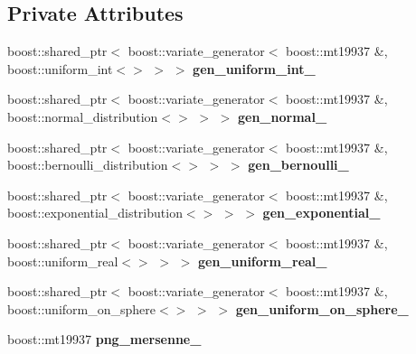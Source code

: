 \subsection*{Private Attributes}
\begin{CompactItemize}
\item 
\hypertarget{class_distribution_generator_7631897310c1faaf465efe831e6d38b0}{
boost::shared\_\-ptr$<$ boost::variate\_\-generator$<$ boost::mt19937 \&, boost::uniform\_\-int$<$$>$ $>$ $>$ \textbf{gen\_\-uniform\_\-int\_\-}}
\label{class_distribution_generator_7631897310c1faaf465efe831e6d38b0}

\item 
\hypertarget{class_distribution_generator_d3ba3b04de2853ff8e7a30dfcef6d081}{
boost::shared\_\-ptr$<$ boost::variate\_\-generator$<$ boost::mt19937 \&, boost::normal\_\-distribution$<$$>$ $>$ $>$ \textbf{gen\_\-normal\_\-}}
\label{class_distribution_generator_d3ba3b04de2853ff8e7a30dfcef6d081}

\item 
\hypertarget{class_distribution_generator_ee0c415f08c1fae8dee3ca10c23f9b96}{
boost::shared\_\-ptr$<$ boost::variate\_\-generator$<$ boost::mt19937 \&, boost::bernoulli\_\-distribution$<$$>$ $>$ $>$ \textbf{gen\_\-bernoulli\_\-}}
\label{class_distribution_generator_ee0c415f08c1fae8dee3ca10c23f9b96}

\item 
\hypertarget{class_distribution_generator_d4807485cfe60d54b47a14e2115987c9}{
boost::shared\_\-ptr$<$ boost::variate\_\-generator$<$ boost::mt19937 \&, boost::exponential\_\-distribution$<$$>$ $>$ $>$ \textbf{gen\_\-exponential\_\-}}
\label{class_distribution_generator_d4807485cfe60d54b47a14e2115987c9}

\item 
\hypertarget{class_distribution_generator_0910c15a4e74475eff33ff5b82a2ac8d}{
boost::shared\_\-ptr$<$ boost::variate\_\-generator$<$ boost::mt19937 \&, boost::uniform\_\-real$<$$>$ $>$ $>$ \textbf{gen\_\-uniform\_\-real\_\-}}
\label{class_distribution_generator_0910c15a4e74475eff33ff5b82a2ac8d}

\item 
\hypertarget{class_distribution_generator_e0b00c288f47cc07973ac3c3d4a23975}{
boost::shared\_\-ptr$<$ boost::variate\_\-generator$<$ boost::mt19937 \&, boost::uniform\_\-on\_\-sphere$<$$>$ $>$ $>$ \textbf{gen\_\-uniform\_\-on\_\-sphere\_\-}}
\label{class_distribution_generator_e0b00c288f47cc07973ac3c3d4a23975}

\item 
\hypertarget{class_distribution_generator_ab245fba18fc27eadc55d0d0892768ad}{
boost::mt19937 \textbf{png\_\-mersenne\_\-}}
\label{class_distribution_generator_ab245fba18fc27eadc55d0d0892768ad}

\end{CompactItemize}


